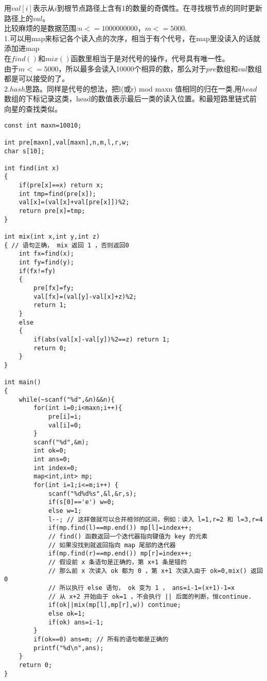 用$val[i]$表示从$i$到根节点路径上含有1的数量的奇偶性。在寻找根节点的同时更新路径上的$val$。 \\
比较麻烦的是数据范围:$n<=1000000000，m<=5000$. \\
1.可以用map来标记各个读入点的次序，相当于有个代号，在map里没读入的话就添加进map \\
在$find()$和$mix()$函数里相当于是对代号的操作，代号具有唯一性。 \\
由于$m<=5000$，所以最多会读入10000个相异的数，那么对于$pre$数组和$val$数组都是可以接受的了。 \\
2.$hash$思路。同样是代号的想法，把l(或r) mod maxn 值相同的归在一类,用$head$数组的下标记录这类，head的数值表示最后一类的读入位置。和最短路里链式前向星的查找类似。
\begin{lstlisting}
const int maxn=10010;

int pre[maxn],val[maxn],n,m,l,r,w;
char s[10];

int find(int x)
{
    if(pre[x]==x) return x;
    int tmp=find(pre[x]);
    val[x]=(val[x]+val[pre[x]])%2;
    return pre[x]=tmp;
}

int mix(int x,int y,int z)
{ // 语句正确， mix 返回 1 ，否则返回0
    int fx=find(x);
    int fy=find(y);
    if(fx!=fy)
    {
        pre[fx]=fy;
        val[fx]=(val[y]-val[x]+z)%2;
        return 1;
    }
    else
    {
        if(abs(val[x]-val[y])%2==z) return 1;
        return 0;
    }
}

int main()
{
    while(~scanf("%d",&n)&&n){
        for(int i=0;i<maxn;i++){
            pre[i]=i;
            val[i]=0;
        }
        scanf("%d",&m);
        int ok=0;
        int ans=0;
        int index=0;
        map<int,int> mp;
        for(int i=1;i<=m;i++) {
            scanf("%d%d%s",&l,&r,s);
            if(s[0]=='e') w=0;
            else w=1;
            l--; // 这样做就可以合并相邻的区间，例如：读入 l=1,r=2 和 l=3,r=4
            if(mp.find(l)==mp.end()) mp[l]=index++;
            // find() 函数返回一个迭代器指向键值为 key 的元素
            // 如果没找到就返回指向 map 尾部的迭代器
            if(mp.find(r)==mp.end()) mp[r]=index++;
            // 假设前 x 条语句是正确的，第 x+1 条是错的
            // 那么前 x 次读入 ok 都为 0 ，第 x+1 次读入由于 ok=0,mix() 返回0
            // 所以执行 else 语句， ok 变为 1 ， ans=i-1=(x+1)-1=x
            // 从 x+2 开始由于 ok=1 ，不会执行 || 后面的判断，恒continue.
            if(ok||mix(mp[l],mp[r],w)) continue;
            else ok=1;
            if(ok) ans=i-1;
        }
        if(ok==0) ans=m; // 所有的语句都是正确的
        printf("%d\n",ans);
    }
    return 0;
}
\end{lstlisting}

